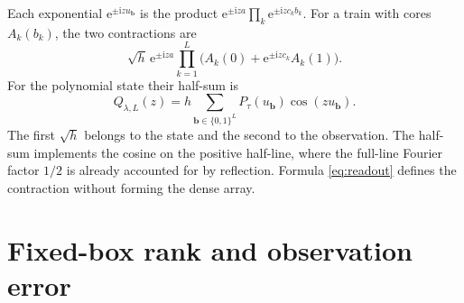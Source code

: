\documentclass[11pt]{article}
\newcommand{\e}{\mathrm e}
\newcommand{\ii}{\mathrm i}
\newcommand{\bits}{\{0,1\}^L}
\begin{document}
Each exponential \(\e^{\pm\ii z u_{\boldsymbol b}}\) is the product
\(\e^{\pm\ii za}\prod_k\e^{\pm\ii z c_k b_k}\). For a train with cores
\(A_k(b_k)\), the two contractions are
\begin{equation}
 \sqrt h\,\e^{\pm\ii za}
     \prod_{k=1}^{L}\bigl(A_k(0)+\e^{\pm\ii z c_k}A_k(1)\bigr).
 \label{eq:readout}
\end{equation}
For the polynomial state their half-sum is
\begin{equation}
 Q_{\lambda,L}(z)
 =h\sum_{\boldsymbol b\in\bits}P_\tau(u_{\boldsymbol b})
                               \cos(zu_{\boldsymbol b}).
 \label{eq:Q}
\end{equation}
The first \(\sqrt h\) belongs to the state and the second to the
observation. The half-sum implements the cosine on the positive
half-line, where the full-line Fourier factor \(1/2\) is already
accounted for by reflection. Formula \eqref{eq:readout} defines the
contraction without forming the dense array.

\section{Fixed-box rank and observation error}
\label{sec:theorem}
\end{document}
